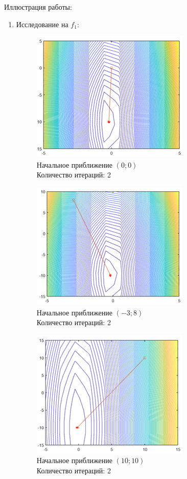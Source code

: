 \documentclass[12pt]{article}
\begin{document}
Иллюстрация работы:
\begin{enumerate}
	\item Исследование на $f_1$:

	\begin{figure}[H]
    	\centering
    	\includegraphics[]{img/f1_1_1.png}
    	\\ Начальное приближение $\left( 0; 0 \right)$
    	\\ Количество итераций: 2
    \end{figure}

	\begin{figure}[H]
    	\centering
    	\includegraphics[]{img/f1_1_2.png}
    	\\ Начальное приближение $\left( -3; 8 \right)$
    	\\ Количество итераций: 2
    \end{figure}

	\begin{figure}[H]
    	\centering
    	\includegraphics[]{img/f1_1_3.png}
    	\\ Начальное приближение $\left( 10; 10 \right)$
    	\\ Количество итераций: 2
    \end{figure}


\end{enumerate}
\end{document}
